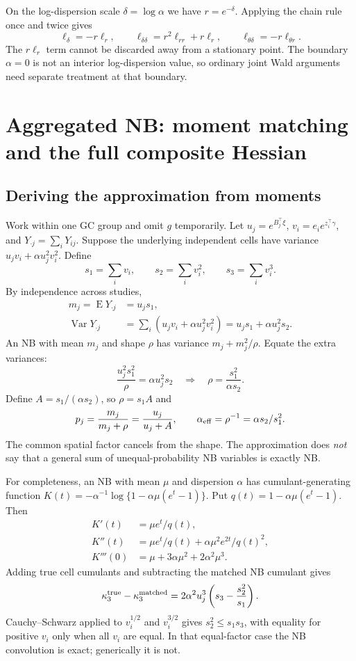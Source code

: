\documentclass[11pt,a4paper]{article}
\newcommand{\E}{\operatorname{E}}
\newcommand{\Var}{\operatorname{Var}}
\numberwithin{equation}{section}
\begin{document}
On the log-dispersion scale $\delta=\log\alpha$ we have $r=e^{-\delta}$.
Applying the chain rule once and twice gives
\[
 \ell_\delta=-r\ell_r,\qquad
 \ell_{\delta\delta}=r^2\ell_{rr}+r\ell_r,\qquad
 \ell_{\theta\delta}=-r\ell_{\theta r}.
\]
The $r\ell_r$ term cannot be discarded away from a stationary point.
The boundary $\alpha=0$ is not an interior log-dispersion value, so
ordinary joint Wald arguments need separate treatment at that boundary.

\section{Aggregated NB: moment matching and the full composite Hessian}
\label{sec:aggregated-nb}

\subsection{Deriving the approximation from moments}
Work within one GC group and omit $g$ temporarily.
Let $u_j=e^{B_j^\top\xi}$, $v_i=e_i e^{z_i^\top\gamma}$, and
$Y_{\cdot j}=\sum_iY_{ij}$. Suppose the underlying independent cells
have variance $u_jv_i+\alpha u_j^2v_i^2$.
Define
\[
 s_1=\sum_i v_i,\qquad s_2=\sum_i v_i^2,\qquad s_3=\sum_i v_i^3.
\]
By independence across studies,
\begin{align}
 m_j=\E Y_{\cdot j}&=u_js_1,\\
 \Var Y_{\cdot j}&=\sum_i(u_jv_i+\alpha u_j^2v_i^2)
                        =u_js_1+\alpha u_j^2s_2.
\end{align}
An NB with mean $m_j$ and shape $\rho$ has variance
$m_j+m_j^2/\rho$. Equate the extra variances:
\[
 \frac{u_j^2s_1^2}{\rho}=\alpha u_j^2s_2
 \quad\Longrightarrow\quad
 \rho=\frac{s_1^2}{\alpha s_2}.
\]
Define $A=s_1/(\alpha s_2)$, so $\rho=s_1A$ and
\begin{equation}\label{eq:agg-parameters}
 p_j=\frac{m_j}{m_j+\rho}=\frac{u_j}{u_j+A},\qquad
 \alpha_{\rm eff}=\rho^{-1}=\alpha s_2/s_1^2.
\end{equation}
The common spatial factor cancels from the shape. The approximation
does \emph{not} say that a general sum of unequal-probability NB
variables is exactly NB.

For completeness, an NB with mean $\mu$ and dispersion $\alpha$
has cumulant-generating function
$K(t)=-\alpha^{-1}\log\{1-\alpha\mu(e^t-1)\}$.
Put $q(t)=1-\alpha\mu(e^t-1)$. Then
\begin{align}
 K'(t)&=\mu e^t/q(t),\\
 K''(t)&=\mu e^t/q(t)+\alpha\mu^2e^{2t}/q(t)^2,\\
 K'''(0)&=\mu+3\alpha\mu^2+2\alpha^2\mu^3.
\end{align}
Adding true cell cumulants and subtracting the matched NB cumulant gives
\begin{equation}
 \kappa_3^{\rm true}-\kappa_3^{\rm matched}
 =2\alpha^2u_j^3\left(s_3-\frac{s_2^2}{s_1}\right).
\end{equation}
Cauchy--Schwarz applied to $v_i^{1/2}$ and $v_i^{3/2}$
gives $s_2^2\le s_1s_3$, with equality for positive $v_i$
only when all $v_i$ are equal. In that equal-factor case the NB
convolution is exact; generically it is not.
\end{document}
